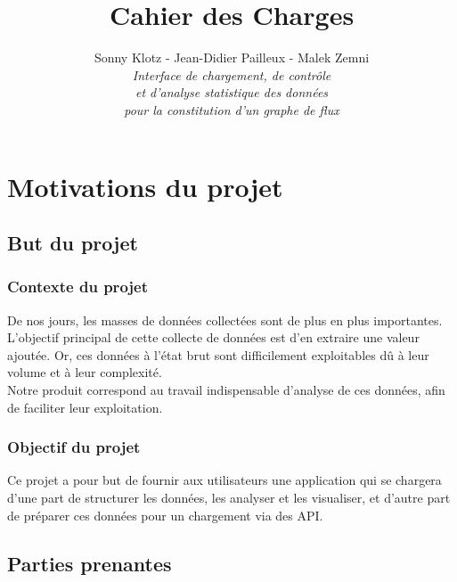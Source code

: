 

\title{\vspace{\fill}\textbf{\Huge Cahier des Charges}}
\author{Sonny Klotz - Jean-Didier Pailleux - Malek Zemni\vspace{2em}\\\textit{Interface de chargement, de contrôle}\\\textit{et d’analyse statistique des données}\\\textit{pour la constitution d’un graphe de flux}\vspace{2em}}


\maketitle\vspace{\fill}
\newpage
\tableofcontents
\newpage

	\section{Motivations du projet}
		\subsection{But du projet}
			\subsubsection{Contexte du projet}
			De nos jours, les masses de données collectées sont de plus en plus importantes. L'objectif principal de cette collecte de données est d'en extraire une valeur ajoutée. Or, ces données à l'état brut sont difficilement exploitables dû à leur volume et à leur complexité.\\
			Notre produit correspond au travail indispensable d'analyse de ces données, afin de faciliter leur exploitation.
			\subsubsection{Objectif du projet}
			Ce projet a pour but de fournir aux utilisateurs une application qui se chargera d'une part de structurer les données, les analyser et les visualiser, et d'autre part de préparer ces données pour un chargement via des API.
		
		
		\subsection{Parties prenantes}
